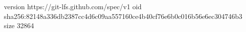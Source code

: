 version https://git-lfs.github.com/spec/v1
oid sha256:82148a336db2387cc4d6c09aa557160ce4b40cf76e6b0c016b56e6ec304746b3
size 32864
